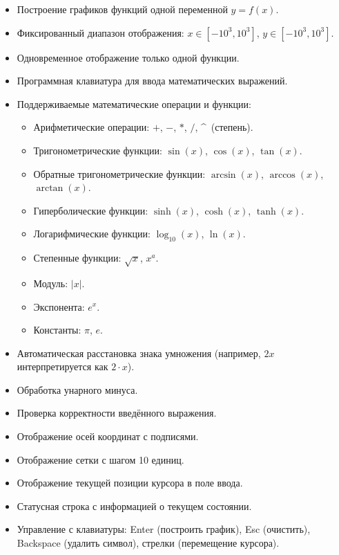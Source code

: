 \documentclass[a4paper, final]{article}
\begin{document}
\begin{itemize}
    \item Построение графиков функций одной переменной $y = f(x)$.
    \item Фиксированный диапазон отображения: $x \in [-10^3, 10^3]$,
          $y \in [-10^3, 10^3]$.
    \item Одновременное отображение только одной функции.
    \item Программная клавиатура для ввода математических выражений.
    \item Поддерживаемые математические операции и функции:
    \begin{itemize}
        \item Арифметические операции: $+$, $-$, $*$, $/$, \^{}~(степень).
        \item Тригонометрические функции: $\sin(x)$, $\cos(x)$, $\tan(x)$.
        \item Обратные тригонометрические функции: $\arcsin(x)$,
              $\arccos(x)$, $\arctan(x)$.
        \item Гиперболические функции: $\sinh(x)$, $\cosh(x)$, $\tanh(x)$.
        \item Логарифмические функции: $\log_{10}(x)$, $\ln(x)$.
        \item Степенные функции: $\sqrt{x}$, $x^a$.
        \item Модуль: $|x|$.
        \item Экспонента: $e^x$.
        \item Константы: $\pi$, $e$.
    \end{itemize}
    \item Автоматическая расстановка знака умножения (например,
          $2x$ интерпретируется как $2 \cdot x$).
    \item Обработка унарного минуса.
    \item Проверка корректности введённого выражения.
    \item Отображение осей координат с подписями.
    \item Отображение сетки с шагом 10 единиц.
    \item Отображение текущей позиции курсора в поле ввода.
    \item Статусная строка с информацией о текущем состоянии.
    \item Управление с клавиатуры: Enter (построить график),
          Esc (очистить), Backspace (удалить символ),
          стрелки (перемещение курсора).
\end{itemize}
\end{document}
